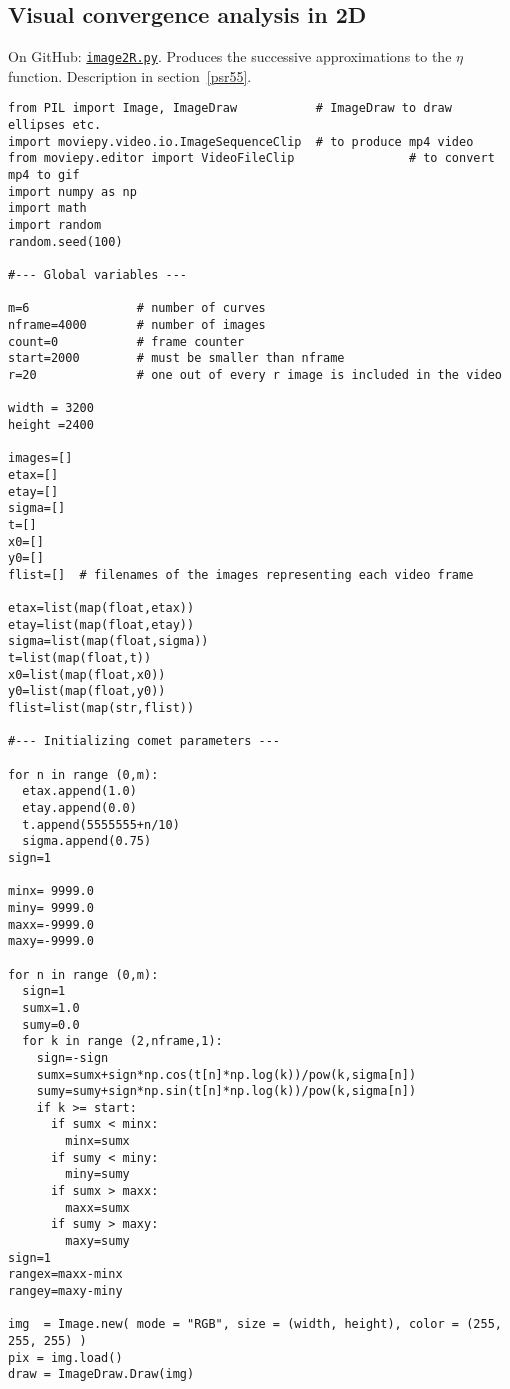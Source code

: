 \documentclass[oneside,10pt]{book}
\begin{document}
\subsection{Visual convergence analysis in 2D}\label{conv222}

On GitHub: \href{https://github.com/VincentGranville/Visualizations/blob/main/Source-Code/image2R.py}{\texttt{image2R.py}}. Produces the successive approximations to the $\eta$ function. Description in section~\ref{psr55}.  

\begin{lstlisting}
from PIL import Image, ImageDraw           # ImageDraw to draw ellipses etc.
import moviepy.video.io.ImageSequenceClip  # to produce mp4 video
from moviepy.editor import VideoFileClip                # to convert mp4 to gif
import numpy as np
import math
import random
random.seed(100)

#--- Global variables ---

m=6               # number of curves
nframe=4000       # number of images 
count=0           # frame counter 
start=2000        # must be smaller than nframe
r=20              # one out of every r image is included in the video

width = 3200 
height =2400 

images=[]
etax=[]
etay=[]
sigma=[]
t=[]
x0=[]
y0=[]
flist=[]  # filenames of the images representing each video frame

etax=list(map(float,etax))
etay=list(map(float,etay))
sigma=list(map(float,sigma))
t=list(map(float,t))
x0=list(map(float,x0))
y0=list(map(float,y0))
flist=list(map(str,flist))

#--- Initializing comet parameters ---

for n in range (0,m):
  etax.append(1.0)
  etay.append(0.0)
  t.append(5555555+n/10)
  sigma.append(0.75)
sign=1

minx= 9999.0
miny= 9999.0
maxx=-9999.0
maxy=-9999.0

for n in range (0,m):
  sign=1
  sumx=1.0
  sumy=0.0
  for k in range (2,nframe,1):
    sign=-sign
    sumx=sumx+sign*np.cos(t[n]*np.log(k))/pow(k,sigma[n])
    sumy=sumy+sign*np.sin(t[n]*np.log(k))/pow(k,sigma[n])
    if k >= start:
      if sumx < minx:
        minx=sumx
      if sumy < miny:
        miny=sumy
      if sumx > maxx:
        maxx=sumx
      if sumy > maxy:
        maxy=sumy
sign=1
rangex=maxx-minx
rangey=maxy-miny

img  = Image.new( mode = "RGB", size = (width, height), color = (255, 255, 255) )
pix = img.load()
draw = ImageDraw.Draw(img)


\end{lstlisting}
\end{document}
